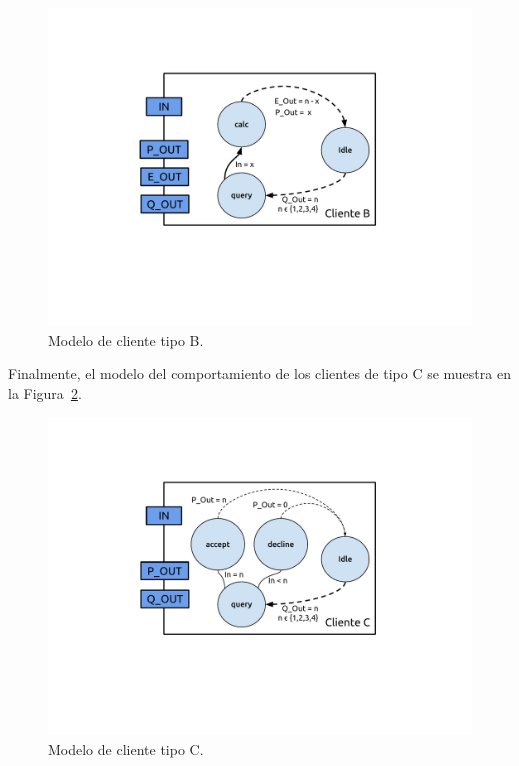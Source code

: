 \documentclass[10pt]{article}
\begin{document}
\begin{figure}
\centering
\includegraphics[scale=1]{img/figura3}
\caption{Modelo de cliente tipo B.}
\label{fig:fig3}
\end{figure}

Finalmente, el modelo del comportamiento de los clientes de tipo C se muestra en la Figura~\ref{fig:fig4}.

\begin{figure}
\centering
\includegraphics[scale=1]{img/figura4}
\caption{Modelo de cliente tipo C.}
\label{fig:fig4}
\end{figure}
\end{document}
